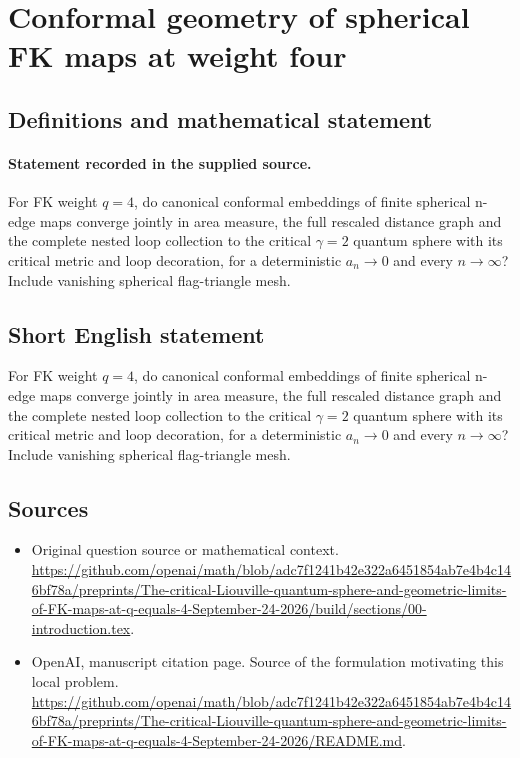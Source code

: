 \documentclass[11pt]{article}
\begin{document}
\section*{Conformal geometry of spherical FK maps at weight four}\label{statement}
\subsection{Definitions and mathematical statement}
\paragraph{Statement recorded in the supplied source.}
For FK weight $q=4$, do canonical conformal embeddings of finite spherical n-edge maps converge jointly in area measure, the full rescaled distance graph and the complete nested loop collection to the critical $\gamma =2$ quantum sphere with its critical metric and loop decoration, for a deterministic $a_n\to 0$ and every $n\to \infty $? Include vanishing spherical flag-triangle mesh.
\subsection{Short English statement}
For FK weight $q=4$, do canonical conformal embeddings of finite spherical n-edge maps converge jointly in area measure, the full rescaled distance graph and the complete nested loop collection to the critical $\gamma =2$ quantum sphere with its critical metric and loop decoration, for a deterministic $a_n\to 0$ and every $n\to \infty $? Include vanishing spherical flag-triangle mesh.
\subsection{Sources}
\begin{itemize}
\item[S1] Original question source or mathematical context.
\url{https://github.com/openai/math/blob/adc7f1241b42e322a6451854ab7e4b4c146bf78a/preprints/The-critical-Liouville-quantum-sphere-and-geometric-limits-of-FK-maps-at-q-equals-4-September-24-2026/build/sections/00-introduction.tex}.
\item[S2] OpenAI, manuscript citation page. Source of the formulation motivating this local problem.
\url{https://github.com/openai/math/blob/adc7f1241b42e322a6451854ab7e4b4c146bf78a/preprints/The-critical-Liouville-quantum-sphere-and-geometric-limits-of-FK-maps-at-q-equals-4-September-24-2026/README.md}.
\end{itemize}
\end{document}
